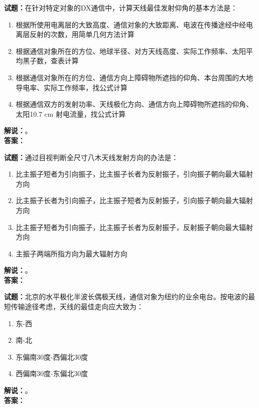 \documentclass{ctexbook}
\begin{document}
\noindent\textbf{试题：}在针对特定对象的DX通信中，计算天线最佳发射仰角的基本方法是：
\begin{enumerate}[leftmargin=3em]
\item 根据所使用电离层的大致高度、通信对象的大致距离、电波在传播途经中经电离层反射的次数，用简单几何方法计算
\item 根据通信对象所在的方位、地球半径、对方天线高度、实际工作频率、太阳平均黑子数，查表计算
\item 根据通信对象所在的方位、通信方向上障碍物所遮挡的仰角、本台周围的大地导电率、实际工作频率，找公式计算
\item 根据通信双方的发射功率、天线极化方向、通信方向上障碍物所遮挡的仰角、太阳10.7 cm 射电流量，找公式计算
\end{enumerate}
\noindent\textbf{解说：}\textbf{}。\\\noindent\textbf{答案：}

\bigskip




\noindent\textbf{试题：}通过目视判断全尺寸八木天线发射方向的办法是：
\begin{enumerate}[leftmargin=3em]
\item 比主振子短者为引向振子，比主振子长者为反射振子，引向振子朝向最大辐射方向
\item 比主振子长者为引向振子，比主振子短者为反射振子，引向振子朝向最大辐射方向
\item 比主振子短者为引向振子，比主振子长者为反射振子，反射振子朝向最大辐射方向
\item 主振子两端所指方向为最大辐射方向
\end{enumerate}
\noindent\textbf{解说：}\textbf{}。\\\noindent\textbf{答案：}

\bigskip




\noindent\textbf{试题：}北京的水平极化半波长偶极天线，通信对象为纽约的业余电台。按电波的最短传输途径考虑，天线的最佳走向应大致为：
\begin{enumerate}[leftmargin=3em]
\item 东-西
\item 南-北
\item 东偏南30度-西偏北30度
\item 西偏南30度-东偏北30度
\end{enumerate}
\noindent\textbf{解说：}\textbf{}。\\\noindent\textbf{答案：}

\bigskip
\end{document}
